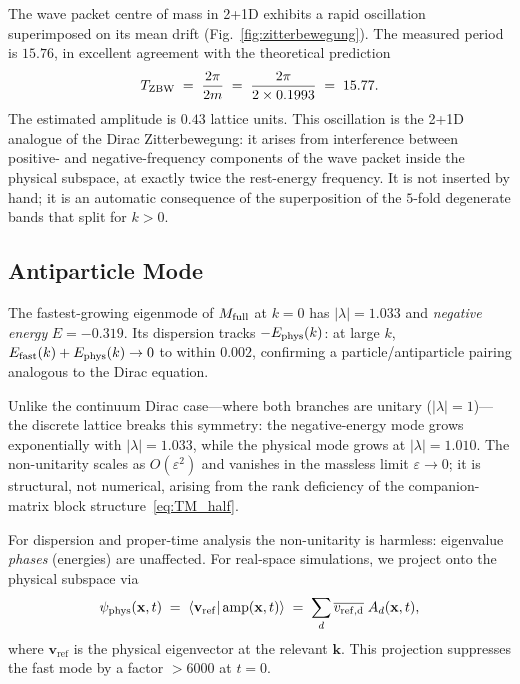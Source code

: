 \documentclass[twocolumn,showpacs,preprintnumbers,amsmath,amssymb]{revtex4-2}
\newcommand{\eps}{\varepsilon}
\newcommand{\vref}{\mathbf{v}_{\mathrm{ref}}}
\begin{document}
The wave packet centre of mass in 2+1D exhibits a rapid oscillation
superimposed on its mean drift (Fig.~\ref{fig:zitterbewegung}).
The measured period is $15.76$, in excellent agreement with the theoretical
prediction
\begin{equation}
  T_{\rm ZBW} \;=\; \frac{2\pi}{2m}
               \;=\; \frac{2\pi}{2 \times 0.1993}
               \;=\; 15.77.
  \label{eq:zbw_period}
\end{equation}
The estimated amplitude is $0.43$ lattice units.
This oscillation is the 2+1D analogue of the Dirac Zitterbewegung: it arises
from interference between positive- and negative-frequency components of the
wave packet inside the physical subspace, at exactly twice the rest-energy
frequency.
It is not inserted by hand; it is an automatic consequence of the
superposition of the $5$-fold degenerate bands that split for $k > 0$.

\subsection{Antiparticle Mode}

The fastest-growing eigenmode of $M_{\rm full}$ at $k = 0$ has
$|\lambda| = 1.033$ and \emph{negative energy} $E = -0.319$.
Its dispersion tracks $-E_{\rm phys}(k)$: at large $k$,
$E_{\rm fast}(k) + E_{\rm phys}(k) \to 0$ to within $0.002$,
confirming a particle/antiparticle pairing analogous to the Dirac equation.

Unlike the continuum Dirac case---where both branches are unitary
($|\lambda| = 1$)---the discrete lattice breaks this symmetry:
the negative-energy mode grows exponentially with $|\lambda| = 1.033$,
while the physical mode grows at $|\lambda| = 1.010$.
The non-unitarity scales as $O(\eps^2)$ and vanishes in the massless limit
$\eps \to 0$; it is structural, not numerical, arising from the rank
deficiency of the companion-matrix block structure~\eqref{eq:TM_half}.

For dispersion and proper-time analysis the non-unitarity is harmless:
eigenvalue \emph{phases} (energies) are unaffected.
For real-space simulations, we project onto the physical subspace via
\begin{equation}
  \psi_{\rm phys}(\mathbf{x}, t)
  \;=\; \langle \vref | \,\mathrm{amp}(\mathbf{x}, t)\rangle
  \;=\; \sum_d \overline{v_{\rm ref,d}}\; A_d(\mathbf{x}, t),
  \label{eq:projection}
\end{equation}
where $\vref$ is the physical eigenvector at the relevant $\mathbf{k}$.
This projection suppresses the fast mode by a factor $> 6000$ at $t = 0$.
\end{document}
